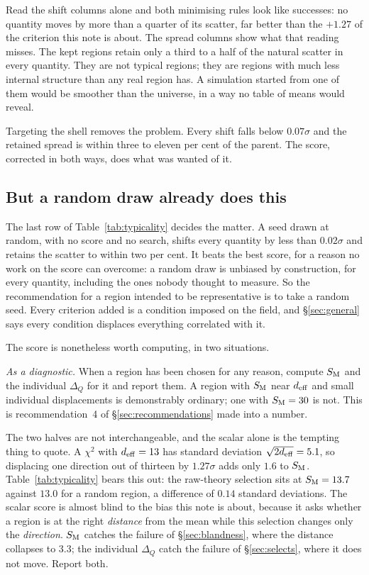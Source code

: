 \documentclass[12pt]{article}
\begin{document}
Read the shift columns alone and both minimising rules look like successes: no
quantity moves by more than a quarter of its scatter, far better than the
$+1.27$ of the criterion this note is about. The spread columns show what that
reading misses. The kept regions retain only a third to a half of the natural
scatter in every quantity. They are not typical regions; they are regions with
much less internal structure than any real region has. A simulation started from
one of them would be smoother than the universe, in a way no table of means
would reveal.

Targeting the shell removes the problem. Every shift falls below $0.07\sigma$
and the retained spread is within three to eleven per cent of the parent. The
score, corrected in both ways, does what was wanted of it.

\subsection{But a random draw already does this}
\label{sec:random}

The last row of Table~\ref{tab:typicality} decides the matter. A seed drawn at
random, with no score and no search, shifts every quantity by less than
$0.02\sigma$ and retains the scatter to within two per cent. It beats the best
score, for a reason no work on the score can overcome: a random draw is unbiased
by construction, for every quantity, including the ones nobody thought to
measure. So the recommendation for a region intended to be representative is to
take a random seed. Every criterion added is a condition imposed on the field,
and \S\ref{sec:general} says every condition displaces everything correlated
with it.

The score is nonetheless worth computing, in two situations.

\emph{As a diagnostic.} When a region has been chosen for any reason, compute
$S_{\rm M}$ and the individual $\Delta_Q$ for it and report them. A region with
$S_{\rm M}$ near $d_{\rm eff}$ and small individual displacements is
demonstrably ordinary; one with $S_{\rm M} = 30$ is not. This is
recommendation~4 of \S\ref{sec:recommendations} made into a number.

The two halves are not interchangeable, and the scalar alone is the tempting
thing to quote. A $\chi^2$ with $d_{\rm eff} = 13$ has standard deviation
$\sqrt{2 d_{\rm eff}} = 5.1$, so displacing one direction out of thirteen by
$1.27\sigma$ adds only $1.6$ to $S_{\rm M}$. Table~\ref{tab:typicality} bears
this out: the raw-theory selection sits at $S_{\rm M} = 13.7$ against $13.0$ for
a random region, a difference of $0.14$ standard deviations. The scalar score is
almost blind to the bias this note is about, because it asks whether a region is
at the right \emph{distance} from the mean while this selection changes only the
\emph{direction}. $S_{\rm M}$ catches the failure of \S\ref{sec:blandness},
where the distance collapses to $3.3$; the individual $\Delta_Q$ catch the
failure of \S\ref{sec:selects}, where it does not move. Report both.
\end{document}
